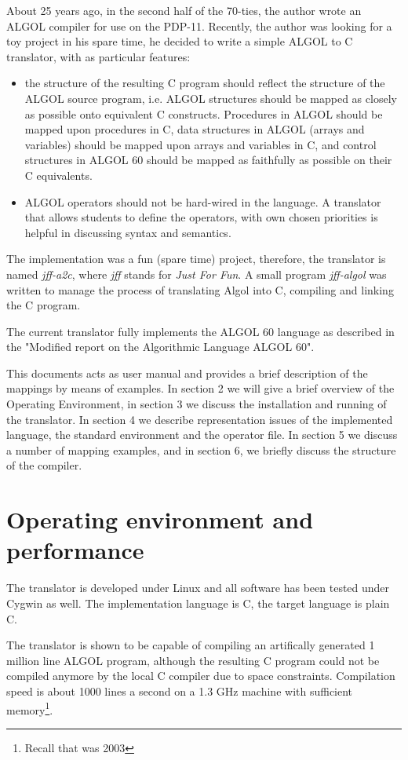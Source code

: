\documentclass[11pt]{article}
\begin{document}
About 25 years ago, in the second half of the 70-ties, the author
wrote an ALGOL compiler for use on the PDP-11.
Recently, the author was looking for a toy
project in his spare time, he decided to write a
simple ALGOL to C translator, with as particular features:
\begin{itemize}
\item
the structure of the resulting C program should reflect the structure of the
ALGOL source program, i.e.  ALGOL structures should be mapped as closely as
possible onto equivalent C constructs. Procedures in ALGOL should be mapped
upon procedures in C, data structures in ALGOL (arrays and variables)
should be mapped upon arrays and variables in C, and control structures in
ALGOL 60 should be mapped as faithfully as possible on
their C equivalents.
\item
ALGOL operators should not be hard-wired in the language.
A translator that allows students to define the operators, with own chosen
priorities is helpful in discussing syntax and semantics.
\end{itemize}

The implementation was a fun (spare time) project, therefore,
the translator is named {\em jff-a2c}, where {\em jff} stands for
{\em Just For Fun}. A small program {\em jff-algol} was written to
manage the process of translating Algol into C, compiling and linking the
C program.

The current translator fully implements the ALGOL 60
language as described in the "Modified report on the Algorithmic Language
ALGOL 60".

This documents acts as user manual and provides 
a brief description of the mappings by means of examples.
In section 2 we will give a brief overview of the Operating Environment,
in section 3 we discuss the installation and running of the translator.
In section 4 we describe representation issues of the implemented language,
the standard environment and the operator file.
In section 5 we discuss a number of mapping examples,
and in section 6, we briefly discuss the structure of the compiler.
\section{Operating environment and performance}

The translator is developed under Linux and all software has
been tested under Cygwin as well. The implementation language is C,
the target language is plain C.

The translator is shown to be capable of compiling an artifically generated
1 million line  ALGOL program, although the resulting C program could not be compiled anymore
by the local C compiler due to space constraints.
Compilation speed is about 1000 lines a second on a 1.3 GHz machine with sufficient memory\footnote{Recall that was 2003}.
\end{document}
